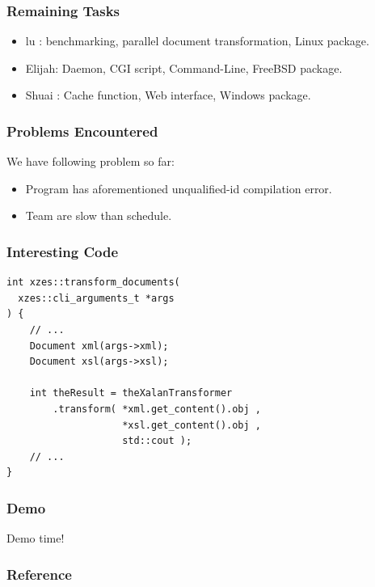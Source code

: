 \documentclass{beamer}
\begin{document}
\begin{frame}
  \frametitle{Remaining Tasks}
  \begin{itemize}
    \item lu    : benchmarking, parallel document transformation, Linux package.
    \item Elijah: Daemon, CGI script, Command-Line, FreeBSD package.
    \item Shuai : Cache function, Web interface, Windows package.
  \end{itemize}
\end{frame}

\begin{frame}
  \frametitle{Problems Encountered}
  We have following problem so far:
  \begin{itemize}
    \item Program has aforementioned unqualified-id compilation error. 
    \item Team are slow than schedule.
  \end{itemize}
\end{frame}

\begin{frame}[fragile]
  \frametitle{Interesting Code}
  \begin{lstlisting}
int xzes::transform_documents(
  xzes::cli_arguments_t *args
) {
    // ...
    Document xml(args->xml);
    Document xsl(args->xsl);

    int theResult = theXalanTransformer
        .transform( *xml.get_content().obj ,
                    *xsl.get_content().obj ,
                    std::cout );
    // ...
}
  \end{lstlisting}
\end{frame}

\begin{frame}
  \frametitle{Demo}
  Demo time!
\end{frame}

\begin{frame}
  \frametitle{Reference}
    \printbibliography
\end{frame}
\end{document}
